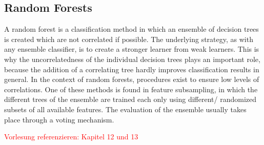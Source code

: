 \subsection{Random Forests}

A random forest is a classification method in which an ensemble of decision trees is created which are not correlated if possible. The underlying strategy, as with any ensemble classifier, is to create a stronger learner from weak learners. This is why the uncorrelatedness of the individual decision trees plays an important role, because the addition of a correlating tree hardly improves classification results in general. In the context of random forests, procedures exist to ensure low levels of correlations. One of these methods is found in feature subsampling, in which the different trees of the ensemble are trained each only using different/ randomized subsets of all available features. The evaluation of the ensemble usually takes place through a voting mechanism.

\textcolor{red}{Vorlesung referenzieren: Kapitel 12 und 13}
